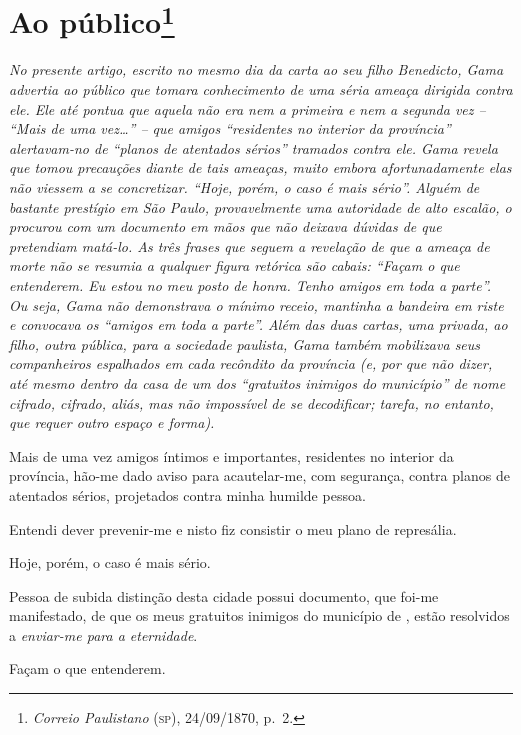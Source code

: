 \chapter{Ao público\footnote{\emph{Correio Paulistano} (\textsc{sp}), 24/09/1870, p.~2.}} %


\begin{didascalia}
\emph{No presente artigo, escrito no mesmo dia da carta ao seu filho
Benedicto, Gama advertia ao público que tomara conhecimento de uma séria
ameaça dirigida contra ele. Ele até pontua que aquela não era nem a
primeira e nem a segunda vez -- ``Mais de uma vez\ldots{}'' -- que amigos
``residentes no interior da província'' alertavam-no de ``planos de
atentados sérios'' tramados contra ele. Gama revela que tomou precauções
diante de tais ameaças, muito embora afortunadamente elas não viessem a
se concretizar. ``Hoje, porém, o caso é mais sério''. Alguém de bastante
prestígio em São Paulo, provavelmente uma autoridade de alto escalão, o
procurou com um documento em mãos que não deixava dúvidas de que
pretendiam matá-lo. As três frases que seguem a revelação de que a
ameaça de morte não se resumia a qualquer figura retórica são cabais:
``Façam o que entenderem. Eu estou no meu posto de honra. Tenho amigos em
toda a parte''. Ou seja, Gama não demonstrava o mínimo receio, mantinha a
bandeira em riste e convocava os ``amigos em toda a parte''. Além das duas
cartas, uma privada, ao filho, outra pública, para a sociedade paulista,
Gama também mobilizava seus companheiros espalhados em cada recôndito da
província (e, por que não dizer, até mesmo dentro da casa de um dos
``gratuitos inimigos do município'' de nome cifrado, cifrado, aliás, mas
não impossível de se decodificar; tarefa, no entanto, que requer outro
espaço e forma).}
\end{didascalia}


Mais de uma vez amigos íntimos e importantes, residentes no interior da
província, hão-me dado aviso para acautelar-me, com segurança, contra
planos de atentados sérios, projetados contra minha humilde pessoa.

Entendi dever prevenir-me e nisto fiz consistir o meu plano de
represália.

Hoje, porém, o caso é mais sério.

Pessoa de subida distinção desta cidade possui documento, que foi-me
manifestado, de que os meus gratuitos inimigos do município de \asterisc{},
estão resolvidos a \emph{enviar-me para a eternidade}.

Façam o que entenderem.

